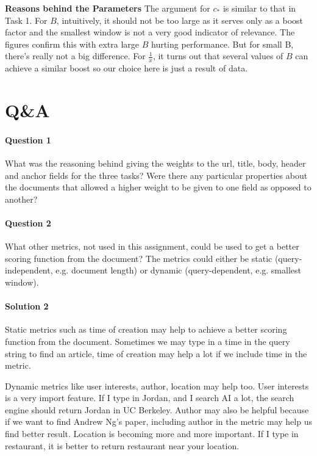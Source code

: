 \documentclass{article}
\begin{document}
\textbf{Reasons behind the Parameters} The argument for $c_*$ is similar to that in Task 1. For $B$, intuitively, it should not be too large as it serves only as a boost factor and the smallest window is not a very good indicator of relevance. The figures confirm this with extra large $B$ hurting performance. But for small B, there's really not a big difference. For $\frac{1}{x}$, it turns out that several values of $B$ can achieve a similar boost so our choice here is just a result of data.

\section{Q\&A}

\paragraph{Question 1}
What was the reasoning behind giving the weights to the url, title, body, header and anchor fields for the three tasks? Were there any particular properties about the documents that allowed a higher weight to be given to one field as opposed to another?

\paragraph{Question 2}
What other metrics, not used in this assignment, could be used to get a better scoring function from the document? The metrics could either be static (query-independent, e.g. document length) or dynamic (query-dependent, e.g. smallest window).

\paragraph{Solution 2}
Static metrics such as time of creation may help to achieve a better scoring function from the document. Sometimes we may type in a time in the query string to find an article, time of creation may help a lot if we include time in the metric.

Dynamic metrics like user interests, author, location may help too. User interests is a very import feature. If I type in Jordan, and I search AI a lot, the search engine should return Jordan in UC Berkeley. Author may also be helpful because if we want to find Andrew Ng's paper, including author in the metric may help us find better result. Location is becoming more and more important. If I type in restaurant, it is better to return restaurant near your location.
\end{document}
